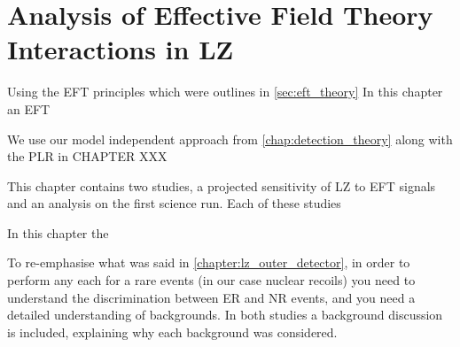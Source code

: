 \chapter{Analysis of Effective Field Theory Interactions in LZ}
\label{chap:eft_work}
Using the EFT principles which were outlines in \autoref{sec:eft_theory} In this chapter an EFT

We use our model independent approach from \autoref{chap:detection_theory} along with the PLR in CHAPTER XXX



\par
This chapter contains two studies, a projected sensitivity of LZ to EFT signals and an analysis on the first science run.
Each of these studies 

\par
In this chapter the 

\par
To re-emphasise what was said in \autoref{chapter:lz_outer_detector}, in order to perform any each for a rare events (in our case nuclear recoils) you need to understand the discrimination between ER and NR events, and you need a detailed understanding of backgrounds.
In both studies a background discussion is included, explaining why each background was considered.


%









%

%

